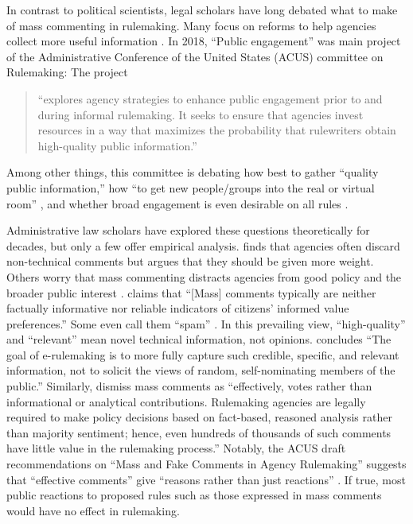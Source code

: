 In contrast to political scientists, legal scholars have long debated what to make of mass commenting in rulemaking. Many focus on reforms to help agencies collect more useful information \citep{Farina2011, Farina2014, Rauch2016}. In 2018, ``Public engagement'' was main project of the Administrative Conference of the United States (ACUS) committee on Rulemaking: %
{The project} 
\begin{quote}``explores agency strategies to enhance public engagement prior to and during informal rulemaking. It seeks to ensure that agencies invest resources in a way that maximizes the probability that rulewriters obtain high-quality public information.'' 
\end{quote} 
Among other things, this committee is debating how best to gather ``quality public information,'' how ``to get new people/groups into the real or virtual room'' \citep{Farina2018}, and whether broad engagement is even desirable on all rules \citep{White2018}. 

Administrative law scholars have explored these questions theoretically for decades, but only a few offer empirical analysis. \citet{Mendelson2011} finds that agencies often discard non-technical comments but argues that they should be given more weight. Others worry that mass commenting distracts agencies from good policy and the broader public interest \citep{Coglianese2006}. \citet[p. 112]{Farina2012} claims that ``[Mass] comments typically are neither factually informative nor reliable indicators of citizens’ informed value preferences.'' Some even call them ``spam'' \citep{Balla2018, Noveck2004}. In this prevailing view, ``high-quality'' and ``relevant'' mean novel technical information, not opinions. \citet[p. 208]{Herz2016} concludes ``The goal of e-rulemaking is to more fully capture such credible, specific, and relevant information, not to solicit the views of random, self-nominating members of the public.'' Similarly,  \citet[p. 4]{Epstein2014} dismiss mass comments as ``effectively, votes rather than informational or analytical contributions. Rulemaking agencies are legally required to make policy decisions based on fact-based, reasoned analysis rather than majority sentiment; hence, even hundreds of thousands of such comments have little value in the rulemaking process.''  Notably, the ACUS draft recommendations on ``Mass and Fake Comments in Agency Rulemaking'' suggests that ``effective comments'' give ``reasons rather than just reactions'' \citep[p. 33]{ACUS2018}. If true, most public reactions to proposed rules such as those expressed in mass comments would have no effect in rulemaking. 

